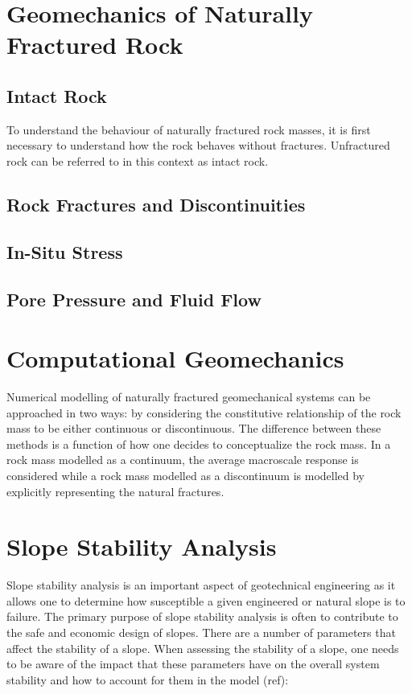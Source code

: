 \section{Geomechanics of Naturally Fractured Rock}


\subsection{Intact Rock}
To understand the behaviour of naturally fractured rock masses, it is first necessary to understand how the rock behaves without fractures. Unfractured rock can be referred to in this context as intact rock. 



\subsection{Rock Fractures and Discontinuities}


\subsection{In-Situ Stress}



\subsection{Pore Pressure and Fluid Flow}

\section{Computational Geomechanics}

Numerical modelling of naturally fractured geomechanical systems can be approached in two ways: by considering the constitutive relationship of the rock mass to be either continuous or discontinuous. The difference between these methods is a function of how one decides to conceptualize the rock mass. In a rock mass modelled as a continuum, the average macroscale response is considered while a rock mass modelled as a discontinuum is modelled by explicitly representing the natural fractures. 

\section{Slope Stability Analysis}
Slope stability analysis is an important aspect of geotechnical engineering as it allows one to determine how susceptible a given engineered or natural slope is to failure. The primary purpose of slope stability analysis is often to contribute to the safe and economic design of slopes. There are a number of parameters that affect the stability of a slope. When assessing the stability of a slope, one needs to be aware of the impact that these parameters have on the overall system stability and how to account for them in the model (ref):

